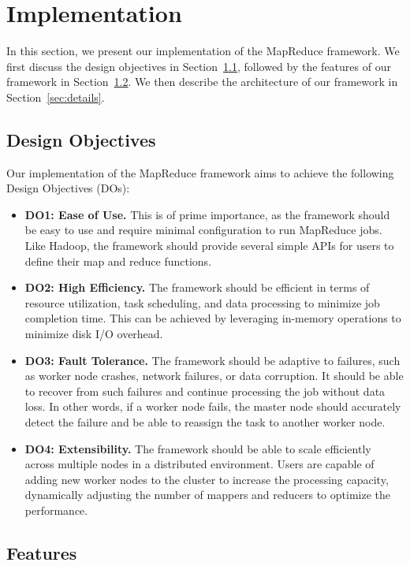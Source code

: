 \section{Implementation}
\label{sec:implementation}

In this section, we present our implementation of the MapReduce framework. We first discuss the design objectives in Section~\ref{sec:design}, followed by the features of our framework in Section~\ref{sec:features}. We then describe the architecture of our framework in Section~\ref{sec:details}.

\subsection{Design Objectives}
\label{sec:design}

Our implementation of the MapReduce framework aims to achieve the following Design Objectives (DOs):

\begin{itemize}
    \item \textbf{DO1: Ease of Use.} This is of prime importance, as the framework should be easy to use and require minimal configuration to run MapReduce jobs. Like Hadoop, the framework should provide several simple APIs for users to define their map and reduce functions.
    \item \textbf{DO2: High Efficiency.} The framework should be efficient in terms of resource utilization, task scheduling, and data processing to minimize job completion time. This can be achieved by leveraging in-memory operations to minimize disk I/O overhead.
    \item \textbf{DO3: Fault Tolerance.} The framework should be adaptive to failures, such as worker node crashes, network failures, or data corruption. It should be able to recover from such failures and continue processing the job without data loss. In other words, if a worker node fails, the master node should accurately detect the failure and be able to reassign the task to another worker node.
    \item \textbf{DO4: Extensibility.} The framework should be able to scale efficiently across multiple nodes in a distributed environment. Users are capable of adding new worker nodes to the cluster to increase the processing capacity, dynamically adjusting the number of mappers and reducers to optimize the performance.
\end{itemize}

\subsection{Features}
\label{sec:features}

